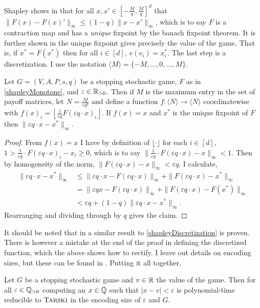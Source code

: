 Shapley shows in \citep{shapley} that for all $x, x' \in [-\frac{M}{q}, \frac{M}{q}]^d$ 
that $\|F(x) - F(x)'\|_\infty \leq (1 - q) \|x - x'\|_\infty$,
which is to say $F$ is a contraction map and has a \emph{unique} fixpoint by the banach fixpoint theorem. 
It is further shown in \citep{shapley} the unique fixpoint gives precisely the value of the game. That is, 
if $x^* = F(x^*)$ then
for all $i \in [d]$, $v(v_i) = x^*_i$. The last step is a discretization. I
use the notation $\langle M \rangle = \{-M, ..., 0, ..., M\}$. 
\newcommand{\angm}{\langle M \rangle}
\begin{lemma} \label{shapleyDiscretization}
  Let $G = (V, A, P, s, q)$ be a stopping stochastic game, $F$ as in \cref{shapleyMonotone}, 
  and $\varepsilon \in \mathbb{R}_{> 0}$. Then if $M$ is the maximum entry in the set of payoff matrices, let 
  $N = \frac{M}{\varepsilon q^2}$ and define a function $f : \langle N \rangle \to \langle N \rangle$ coordinatewise with
  $f(x)_i = \left\lfloor \frac{1}{\varepsilon q} F(\varepsilon q \cdot x)_i \right\rfloor$. If $f(x) = x$
  and $x^*$ is the unique fixpoint of $F$ then $\|\varepsilon q \cdot x - x^*\|_\infty$.
\end{lemma}
\begin{proof}
  From $f(x) = x$ I have by definition of $\lfloor \cdot \rfloor$ for each $i \in [d]$,
  $1 > \frac{1}{\varepsilon q} \cdot F(\varepsilon q \cdot x)_i - x_i \geq 0$, which is to say
  $\|\frac{1}{\varepsilon q} \cdot F(\varepsilon q \cdot x) - x\|_\infty < 1$. Then by homogeneity of the norm,
  $\|F(\varepsilon q \cdot x) - x\|_\infty < \varepsilon q$. I calculate,
  \begin{align*}
    \|\varepsilon q \cdot x - x^* \|_\infty &\leq \|\varepsilon q \cdot x - F(\varepsilon q \cdot x) \|_\infty
                                           + \| F(\varepsilon q \cdot x) - x^* \|_\infty \\
                                      &=  \|\varepsilon q x - F(\varepsilon q \cdot x) \|_\infty
                                        +  \| F(\varepsilon q \cdot x) - F(x^*) \|_\infty \\
                                      &< \varepsilon q + (1 - q)\| \varepsilon q \cdot x - x^* \|_\infty.
  \end{align*}
  Rearranging and dividing through by $q$ gives the claim.
\end{proof}
It should be noted that in \citep[Proposition 6.2.]{lowerBound} a similar result to \cref{shapleyDiscretization} 
is proven. There is however a mistake at the end of the proof in defining the discretized function, which the above
shows how to rectify.
I leave out details on encoding sizes, but these can be found in \citep{lowerBound}.
Putting it all together,
\begin{theorem}
  Let $G$ be a stopping stochastic game and $v \in \mathbb{R}$ the value of the game. Then for all $\varepsilon \in \mathbb{Q}_{> 0}$
  computing 
  an $x \in \mathbb{Q}$ such that $|x - v| < \varepsilon$ is polynomial-time reducible to $\textsc{Tarski}$ in the encoding size
  of $\varepsilon$ and $G$.
\end{theorem}
